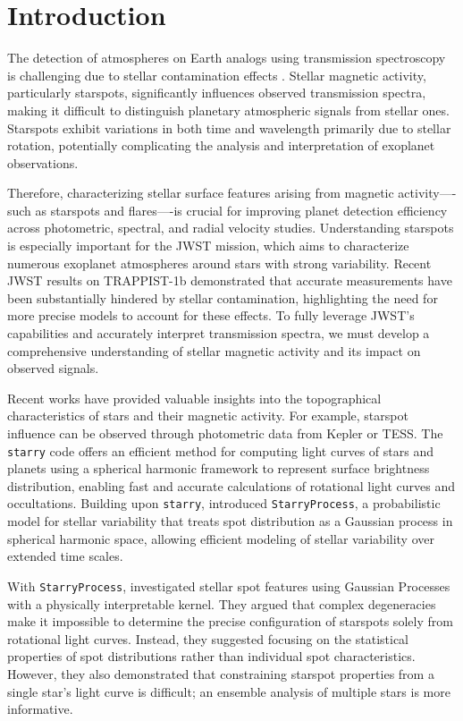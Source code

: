 \documentclass[twocolumn]{aastex631}
\begin{document}
\section{Introduction}
\label{sec:intro}
The detection of atmospheres on Earth analogs using transmission spectroscopy is challenging due to stellar 
contamination effects \citep{Ducrot2018, Morris2018}. Stellar magnetic activity, particularly starspots, significantly 
influences observed transmission spectra, making it difficult to distinguish planetary atmospheric signals from stellar ones. 
Starspots exhibit variations in both time and wavelength primarily due to stellar rotation, potentially complicating the analysis 
and interpretation of exoplanet observations.

Therefore, characterizing stellar surface features arising from magnetic activity—-such as starspots and flares—-is crucial for 
improving planet detection efficiency across photometric, spectral, and radial velocity studies. Understanding starspots is 
especially important for the JWST mission, which aims to characterize numerous exoplanet atmospheres around stars with strong 
variability. Recent JWST results on TRAPPIST-1b \citep{Lim2023} demonstrated that accurate measurements have been substantially 
hindered by stellar contamination, highlighting the need for more precise models to account for these effects. To fully leverage 
JWST's capabilities and accurately interpret transmission spectra, we must develop a comprehensive understanding of stellar 
magnetic activity and its impact on observed signals.

Recent works have provided valuable insights into the topographical characteristics of stars and their magnetic activity. 
For example, starspot influence can be observed through photometric data from Kepler or TESS. The \texttt{starry} code 
\citep{Luger2019} offers an efficient method for computing light curves of stars and planets using a spherical harmonic 
framework to represent surface brightness distribution, enabling fast and accurate calculations of rotational light curves 
and occultations. Building upon \texttt{starry}, \citet{Luger2021b} introduced \texttt{StarryProcess}, a probabilistic model 
for stellar variability that treats spot distribution as a Gaussian process in spherical harmonic space, allowing efficient 
modeling of stellar variability over extended time scales.

With \texttt{StarryProcess}, \citet{Luger2021b} investigated stellar spot features using Gaussian Processes with 
a physically interpretable kernel. They argued that complex degeneracies make it impossible to determine the precise 
configuration of starspots solely from rotational light curves. Instead, they suggested focusing on the statistical properties 
of spot distributions rather than individual spot characteristics. However, they also demonstrated that constraining starspot 
properties from a single star's light curve is difficult; an ensemble analysis of multiple stars is more informative.
\end{document}
